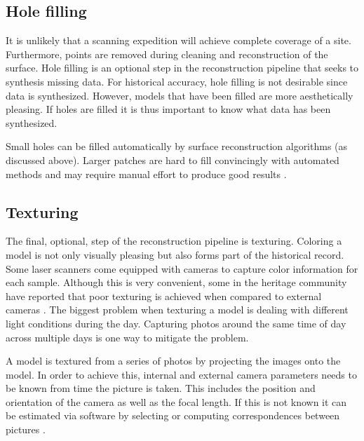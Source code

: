 

\subsection{Hole filling} \label{sec:filling}

It is unlikely that a scanning expedition will achieve complete coverage of a site. Furthermore, points are removed during cleaning and reconstruction of the surface. Hole filling is an optional step in the reconstruction pipeline that seeks to synthesis missing data. For historical accuracy, hole filling is not desirable since data is synthesized. However, models that have been filled are more aesthetically pleasing. If holes are filled it is thus important to know what data has been synthesized.

Small holes can be filled automatically by surface reconstruction algorithms (as discussed above). Larger patches are hard to fill convincingly with automated methods and may require manual effort to produce good results \cite{Ruther2011}. 


\subsection{Texturing} \label{sec:texturing}

The final, optional, step of the reconstruction pipeline is texturing. Coloring a model is not only visually pleasing but also forms part of the historical record. Some laser scanners come equipped with cameras to capture color information for each sample. Although this is very convenient, some in the heritage community have reported that poor texturing is achieved when compared to external cameras \cite{Ruther2011}. The biggest problem when texturing a model is dealing with different light conditions during the day. Capturing photos around the same time of day across multiple days is one way to mitigate the problem.

A model is textured from a series of photos by projecting the images onto the model. In order to achieve this, internal and external camera parameters needs to be known from time the picture is taken. This includes the position and orientation of the camera as well as the focal length. If this is not known it can be estimated via software by selecting or computing correspondences between pictures \cite{Ruther2011}.

